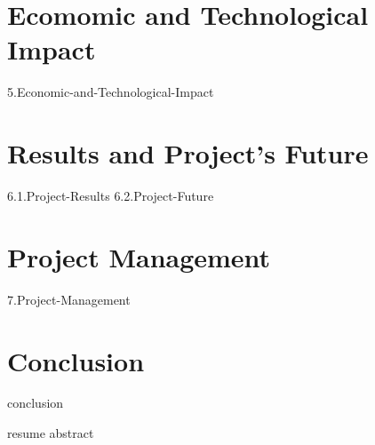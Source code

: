 \documentclass{tnreport}
\begin{document}
\cleardoublepage

\chapter{Ecomomic and Technological Impact}
    {5.Economic-and-Technological-Impact}
\cleardoublepage

\chapter{Results and Project's Future}

    {6.1.Project-Results}
    {6.2.Project-Future}
    
\cleardoublepage

\chapter{Project Management}
    {7.Project-Management}
\cleardoublepage

\chapter*{Conclusion}
    {conclusion}
\cleardoublepage

\printbibliography
{}
\cleardoublepage

\listoffigures
\cleardoublepage

\listoftables
\cleardoublepage

\lstlistoflistings
\cleardoublepage

\printglossary[type=\acronymtype]

\printglossary
\cleardoublepage


\thispagestyle{empty}

{resume}
{abstract}
\end{document}
